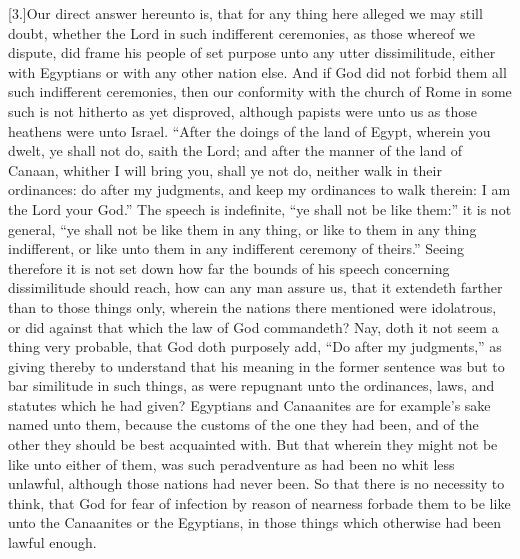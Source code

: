 [3.]Our direct answer hereunto is, that for any thing here alleged we may still doubt, whether the Lord in such indifferent ceremonies, as those whereof we dispute, did frame his  people of set purpose unto any utter dissimilitude, either with Egyptians or with any other nation else. And if God did not forbid them all such indifferent ceremonies, then our conformity with the church of Rome in some such is not hitherto as yet disproved, although papists were unto us as those heathens were unto Israel. “After the doings of the land of Egypt, wherein you dwelt, ye shall not do, saith the Lord; and after the manner of the land of Canaan, whither I will bring you, shall ye not do, neither walk in their ordinances: do after my judgments, and keep my ordinances to walk therein: I am the Lord your God.” The speech is indefinite, “ye shall not be like them:” it is not general, “ye shall not be like them in any thing, or like to them in any thing indifferent, or like unto them in any indifferent ceremony of theirs.” Seeing therefore it is not set down how far the bounds of his speech concerning dissimilitude should reach, how can any man assure us, that it extendeth farther than to those things only, wherein the nations there mentioned were idolatrous, or did against that which the law of God commandeth? Nay, doth it not seem a thing very probable, that God doth purposely add, “Do after my judgments,” as giving thereby to understand that his meaning in the former sentence was but to bar similitude in such things, as were repugnant unto the ordinances, laws, and statutes which he had given? Egyptians and Canaanites are for example’s sake named unto them, because the customs of the one they had been, and of the other they should be best acquainted with. But that wherein they might not be like unto either of them, was such peradventure as had been no whit less unlawful, although those nations had never been. So that there is no necessity to think, that God for fear of infection by reason of nearness forbade them to be like unto the Canaanites or the Egyptians, in those things which otherwise had been lawful enough.

